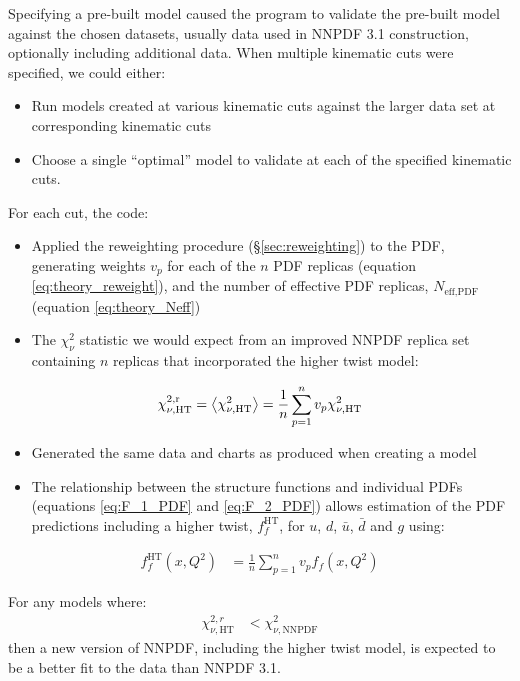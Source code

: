 \documentclass[12pt,a4paper]{report}
\newcommand*{\lr}[1]{\left( {#1} \right)}
\begin{document}
Specifying a pre-built model caused the program to validate the pre-built model against the chosen datasets, usually data used in NNPDF 3.1 construction, optionally including additional data. When multiple kinematic cuts were specified, we could either:
\begin{itemize}
\item Run models created at various kinematic cuts against the larger data set at corresponding kinematic cuts
\item Choose a single ``optimal'' model to validate at each of the specified kinematic cuts.
\end{itemize}
For each cut, the code:
\begin{itemize}
\item Applied the reweighting procedure (\S \ref{sec:reweighting}) to the PDF, generating weights $v_p$ for each of the $n$ PDF replicas (equation \ref{eq:theory_reweight}), and the number of effective PDF replicas, $N_\textrm{eff,PDF}$ (equation \ref{eq:theory_Neff})
\item The $\chi_\nu^2$ statistic we would expect from an improved NNPDF replica set containing $n$ replicas that incorporated the higher twist model:
\end{itemize}
\begin{equation}
\label{eq:chi_nu_HT_reweight} \chi_{\nu,\textrm{HT}}^{2,\textrm{r}} = \expval{\chi_{\nu,\textrm{HT}}^2} = \frac{1}{n} \sum_{p=1}^n v_p \chi_{\nu,\textrm{HT}}^2
\end{equation}
\begin{itemize}
\item Generated the same data and charts as produced when creating a model
\item The relationship between the structure functions and individual PDFs (equations \ref{eq:F_1_PDF} and \ref{eq:F_2_PDF}) allows estimation of the PDF predictions including a higher twist, $f_f^{\textrm{HT}}$, for $u$, $d$, $\bar{u}$, $\bar{d}$ and $g$ using:
\end{itemize}
\begin{align}
\label{eq:pdf_pred} f_f^{\textrm{HT}} \lr{x, Q^2} &= \frac{1}{n} \sum_{p=1}^n v_p f_f \lr{x, Q^2}
\end{align}

For any models where:
\begin{align}
\chi_{\nu,\textrm{HT}}^{2,r} &< \chi_{\nu,\textrm{NNPDF}}^2
\end{align}
then a new version of NNPDF, including the higher twist model, is expected to be a better fit to the data than NNPDF 3.1.
\end{document}

